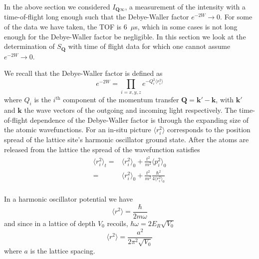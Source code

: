 \documentclass[11pt,letter]{article}
\newcommand{\bv}[1]{\ensuremath{\bm{#1}}}
\newcommand{\Iqtof}{\ensuremath{I_{\bv{Q}\infty} }}
\begin{document}
In the above section we considered $\Iqtof$, a measurement of the intensity with
a time-of-flight long enough such that the Debye-Waller factor $e^{-2W}
\rightarrow 0 $.   For some of the data we have taken, the TOF is 6~$\mu$s,
which in some cases is not long enough for the Debye-Waller factor be
negligible.  In this section we look at the determination of $S_{\bv{Q}}$ with
time of flight data for which one cannot assume $e^{-2W} \rightarrow 0 $.  

We recall that the Debye-Waller factor is defined as
\begin{equation}
    e^{-2W} = 
      \prod_{i=x,y,z} e^{ -Q_{i}^{2}\langle r_{i} ^{2} \rangle } 
\end{equation}
where $Q_{i}$ is the $i^{\text{th}}$ component of the momentum transfer $\bv{Q}
= \bv{k}' - \bv{k}$,  with $\bv{k}'$ and $\bv{k}$ the wave vectors of the
outgoing and incoming light respectively.  The time-of-flight dependence of the
Debye-Waller factor is through the expanding size of the atomic wavefunctions.
For an in-situ picture $\langle r_{i}^{2}\rangle$ corresponds to the position
spread of the lattice site's harmonic oscillator ground state.  After the atoms
are released from the lattice the spread of the wavefunction satisfies 
\begin{equation}
\begin{split} 
  \langle r_{i}^{2} \rangle_{t} = &
   \langle r_{i}^{2} \rangle_{0} + 
  \frac{t^{2}}{m^{2}} \langle p_{i}^{2} \rangle_{0} \\
  = &  \langle r_{i}^{2} \rangle_{0} + 
  \frac{t^{2}}{m^{2}} \frac{\hbar^{2}}{4  \langle r_{i}^{2} \rangle_{0} } \\
\end{split}
\end{equation} 

In a harmonic oscillator potential we have 
\begin{equation}
    \langle r^{2} \rangle = \frac{\hbar}{2 m \omega}
\end{equation}
and since in a lattice of depth $V_{0}$ recoils,  $\hbar \omega = 2 E_{R}
\sqrt{V_{0}}$  
\begin{equation}
    \langle r^{2} \rangle = \frac{a^{2}}{ 2 \pi^{2} \sqrt{V_{0}} }
\end{equation}
where $a$ is the lattice spacing. 
\end{document}
